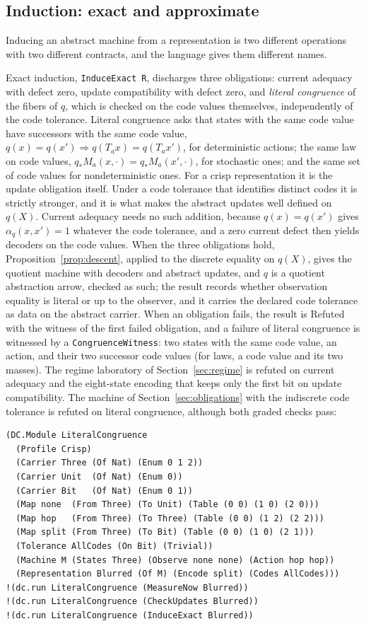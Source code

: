 \documentclass[11pt]{article}
\newcommand{\code}[1]{\texttt{#1}}
\theoremstyle{definition}
\theoremstyle{plain}
\begin{document}
\subsection{Induction: exact and approximate}\label{sec:induce}

Inducing an abstract machine from a representation is two different operations with two different
contracts, and the language gives them different names.

Exact induction, \code{InduceExact R}, discharges three obligations: current adequacy with defect
zero, update compatibility with defect zero, and \emph{literal congruence} of the fibers of $q$,
which is checked on the code values themselves, independently of the code tolerance. Literal
congruence asks that states with the same code value have successors with the same code value,
$q(x)=q(x')\Rightarrow q(T_ax)=q(T_ax')$, for deterministic actions; the same law on code values,
$q_*M_a(x,\cdot)=q_*M_a(x',\cdot)$, for stochastic ones; and the same set of code values for
nondeterministic ones. For a crisp representation it is the update obligation itself. Under a code
tolerance that identifies distinct codes it is strictly stronger, and it is what makes the abstract
updates well defined on $q(X)$. Current adequacy needs no such addition, because $q(x)=q(x')$ gives
$\alpha_q(x,x')=1$ whatever the code tolerance, and a zero current defect then yields decoders on the
code values. When the three obligations hold, Proposition~\ref{prop:descent}, applied to the discrete
equality on $q(X)$, gives the quotient machine with decoders and abstract updates, and $q$ is a
quotient abstraction arrow, checked as such; the result records whether observation equality is
literal or up to the observer, and it carries the declared code tolerance as data on the abstract
carrier. When an obligation fails, the result is Refuted with the witness of the first failed
obligation, and a failure of literal congruence is witnessed by a \code{CongruenceWitness}: two states
with the same code value, an action, and their two successor code values (for laws, a code value
and its two masses). The regime laboratory of Section~\ref{sec:regime} is refuted on current adequacy
and the eight-state encoding that keeps only the first bit on update compatibility. The machine of
Section~\ref{sec:obligations} with the indiscrete code tolerance is refuted on literal congruence,
although both graded checks pass:
\begin{lstlisting}[basicstyle=\ttfamily\footnotesize,title={\scriptsize\ttfamily fixtures/hypotheses.metta}]
(DC.Module LiteralCongruence
  (Profile Crisp)
  (Carrier Three (Of Nat) (Enum 0 1 2))
  (Carrier Unit  (Of Nat) (Enum 0))
  (Carrier Bit   (Of Nat) (Enum 0 1))
  (Map none  (From Three) (To Unit) (Table (0 0) (1 0) (2 0)))
  (Map hop   (From Three) (To Three) (Table (0 0) (1 2) (2 2)))
  (Map split (From Three) (To Bit) (Table (0 0) (1 0) (2 1)))
  (Tolerance AllCodes (On Bit) (Trivial))
  (Machine M (States Three) (Observe none none) (Action hop hop))
  (Representation Blurred (Of M) (Encode split) (Codes AllCodes)))
!(dc.run LiteralCongruence (MeasureNow Blurred))
!(dc.run LiteralCongruence (CheckUpdates Blurred))
!(dc.run LiteralCongruence (InduceExact Blurred))
\end{lstlisting}
\end{document}
